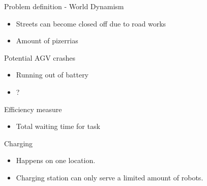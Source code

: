 \begin{frame}{Problem definition - World}
    Dynamism
    \begin{itemize}
        \item Streets can become closed off due to road works
        \item Amount of pizerrias
    \end{itemize}

    Potential AGV crashes
    \begin{itemize}
        \item Running out of battery
        \item ?
    \end{itemize}

    Efficiency measure
    \begin{itemize}
        \item Total waiting time for task
    \end{itemize}

    Charging
    \begin{itemize}
        \item Happens on one location.
        \item Charging station can only serve a limited amount of robots.
    \end{itemize}
\end{frame}
